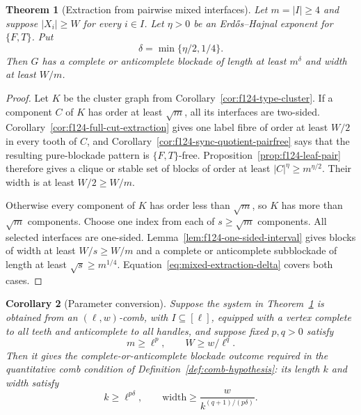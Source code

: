 \documentclass[11pt]{article}
\numberwithin{equation}{section}
\theoremstyle{plain}
\newtheorem{theorem}{Theorem}[section]
\newtheorem{corollary}[theorem]{Corollary}
\theoremstyle{definition}
\begin{document}
\begin{theorem}[Extraction from pairwise mixed interfaces]
\label{thm:f124-mixed-affine-extraction}
Let $m=|I|\geq4$ and suppose $|X_i|\geq W$ for every $i\in I$.  Let
$\eta>0$ be an Erd\H{o}s--Hajnal exponent for $\{F,T\}$.  Put
\begin{equation}
                         \delta=\min\{\eta/2,1/4\}.
 \label{eq:mixed-extraction-delta}
\end{equation}
Then $G$ has a complete or anticomplete blockade of length at least
$m^\delta$ and width at least $W/m$.
\end{theorem}

\begin{proof}
Let $K$ be the cluster graph from
Corollary~\ref{cor:f124-type-cluster}.  If a component $C$ of $K$ has
order at least $\sqrt m$, all its interfaces are two-sided.
Corollary~\ref{cor:f124-full-cut-extraction} gives one label fibre of
order at least $W/2$ in every tooth of $C$, and
Corollary~\ref{cor:f124-sync-quotient-pairfree} says that the resulting
pure-blockade pattern is $\{F,T\}$-free.
Proposition~\ref{prop:f124-leaf-pair} therefore gives a clique or stable
set of blocks of order at least
$|C|^\eta\geq m^{\eta/2}$.  Their width is at least $W/2\geq W/m$.

Otherwise every component of $K$ has order less than $\sqrt m$, so
$K$ has more than $\sqrt m$ components.  Choose one index from each of
$s\geq\sqrt m$ components.  All selected interfaces are one-sided.
Lemma~\ref{lem:f124-one-sided-interval} gives blocks of width at least
$W/s\geq W/m$ and a complete or anticomplete subblockade of length at
least $\sqrt s\geq m^{1/4}$.
Equation~\eqref{eq:mixed-extraction-delta} covers both cases.
\end{proof}

\begin{corollary}[Parameter conversion]
\label{cor:f124-mixed-affine-bookkeeping}
Suppose the system in Theorem~\ref{thm:f124-mixed-affine-extraction} is
obtained from an $(\ell,w)$-comb, with $I\subseteq[\ell]$, equipped with
a vertex complete to all teeth and anticomplete to all handles, and
suppose fixed $p,q>0$ satisfy
\[
                         m\geq\ell^p,
              \qquad    W\geq w/\ell^q.
\]
Then it gives the complete-or-anticomplete blockade outcome required in
the quantitative comb condition of
Definition~\ref{def:comb-hypothesis}: its
length $k$ and
width satisfy
\begin{equation}
              k\geq\ell^{p\delta},
       \qquad \text{width}\geq \frac{w}{k^{(q+1)/(p\delta)}}.
 \label{eq:mixed-conversion-bounds}
\end{equation}
\end{corollary}
\end{document}
